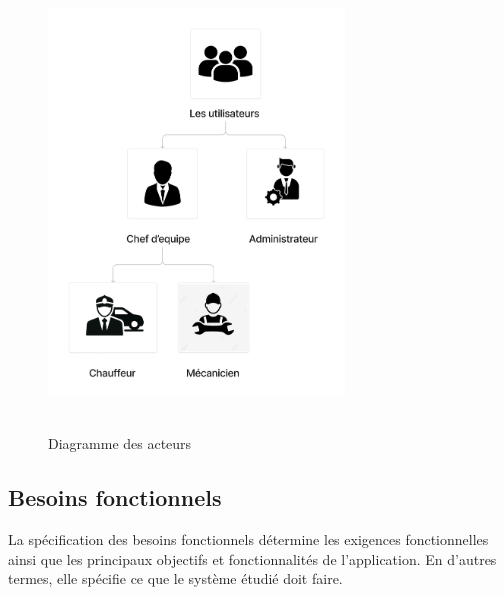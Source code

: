 \begin{figure}[ht!]
  \centering
  \includegraphics[width=0.7\textwidth,height=12cm]{chap2.images/Diagramme des acteurs.png}
  \caption{Diagramme des acteurs}
\end{figure}






\newpage
\subsection{Besoins fonctionnels}
La spécification des besoins fonctionnels détermine les exigences fonctionnelles ainsi que les principaux objectifs et fonctionnalités de l'application. En d'autres termes, elle spécifie ce que le système étudié doit faire.\\

